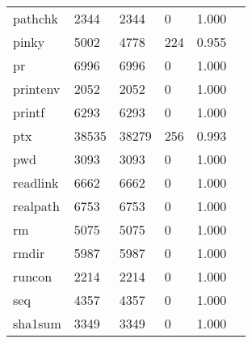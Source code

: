 \begin{longtable}{lp{2.4cm}p{2.4cm}p{2.4cm}p{2.4cm}p{2.4cm}}
pathchk   &                                    2344 &                        2344 &                            0 &                                   1.000 \\
pinky     &                                    5002 &                        4778 &                          224 &                                   0.955 \\
pr        &                                    6996 &                        6996 &                            0 &                                   1.000 \\
printenv  &                                    2052 &                        2052 &                            0 &                                   1.000 \\
printf    &                                    6293 &                        6293 &                            0 &                                   1.000 \\
ptx       &                                   38535 &                       38279 &                          256 &                                   0.993 \\
pwd       &                                    3093 &                        3093 &                            0 &                                   1.000 \\
readlink  &                                    6662 &                        6662 &                            0 &                                   1.000 \\
realpath  &                                    6753 &                        6753 &                            0 &                                   1.000 \\
rm        &                                    5075 &                        5075 &                            0 &                                   1.000 \\
rmdir     &                                    5987 &                        5987 &                            0 &                                   1.000 \\
runcon    &                                    2214 &                        2214 &                            0 &                                   1.000 \\
seq       &                                    4357 &                        4357 &                            0 &                                   1.000 \\
sha1sum   &                                    3349 &                        3349 &                            0 &                                   1.000 \\

\end{longtable}

